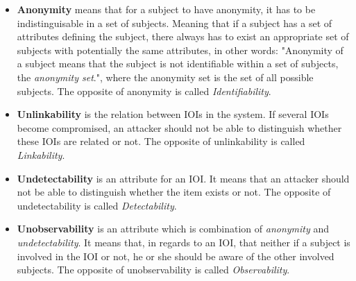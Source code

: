


\begin{itemize}
\item[] \textbf{Anonymity} means that for a subject to have anonymity, it has to be indistinguisable in a set of subjects. Meaning that if a subject has a set of attributes defining the subject, there always has to exist an appropriate set of subjects with potentially the same attributes, in other words: "Anonymity of a subject means that the subject is not identifiable within a set of subjects, the \textit{anonymity set}.", where the anonymity set is the set of all possible subjects. The opposite of anonymity is called \textit{Identifiability}. 

\item[] \textbf{Unlinkability} is the relation between IOIs in the system. If several IOIs become compromised, an attacker should not be able to distinguish whether these IOIs are related or not. The opposite of unlinkability is called \textit{Linkability}.

\item[] \textbf{Undetectability} is an attribute for an IOI. It means that an attacker should not be able to distinguish whether the item exists or not. The opposite of undetectability is called \textit{Detectability}.

\item[] \textbf{Unobservability} is an attribute which is combination of \textit{anonymity} and \textit{undetectability}. It means that, in regards to an IOI, that neither if a subject is involved in the IOI or not, he or she should be aware of the other involved subjects. The opposite of unobservability is called \textit{Observability}.
\end{itemize}



